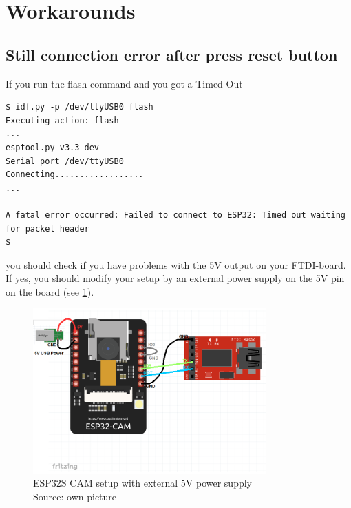 \graphicspath{ {./workaround/pictures/} }
\section{Workarounds}
\subsection{Still connection error after press reset button}
If you run the flash command and you got a Timed Out
\begin{lstlisting}
$ idf.py -p /dev/ttyUSB0 flash
Executing action: flash
...
esptool.py v3.3-dev
Serial port /dev/ttyUSB0
Connecting..................
...

A fatal error occurred: Failed to connect to ESP32: Timed out waiting for packet header
$
\end{lstlisting}
you should check if you have problems with the 5V output on your FTDI-board. If yes, you should modify your setup by an external power supply on the 5V pin on the board (see \ref{ESP32-S-CAM-setup-with-external-5v}).

\begin{figure}[H]
\centering
\includegraphics[width=0.80\textwidth]{esp32-cam-s_setup-with_5_usb_power}
\caption[ESP32S CAM setup with external 5V power supply]{ESP32S CAM setup with external 5V power supply \\ Source: own picture}
\label{ESP32-S-CAM-setup-with-external-5v}
\end{figure}